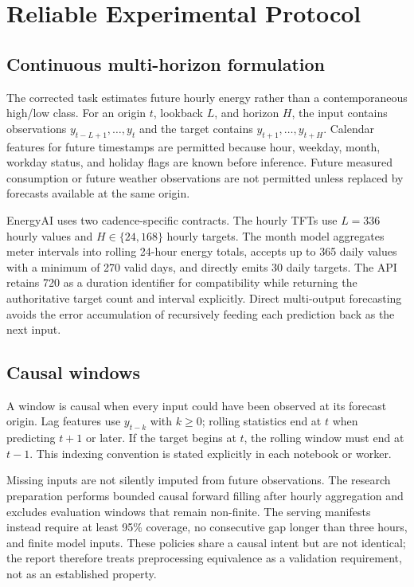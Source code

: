 \chapter{Reliable Experimental Protocol}
\label{chap:protocol}

\section{Continuous multi-horizon formulation}

The corrected task estimates future hourly energy rather than a contemporaneous high/low class. For an origin $t$, lookback $L$, and horizon $H$, the input contains observations $y_{t-L+1},\ldots,y_t$ and the target contains $y_{t+1},\ldots,y_{t+H}$. Calendar features for future timestamps are permitted because hour, weekday, month, workday status, and holiday flags are known before inference. Future measured consumption or future weather observations are not permitted unless replaced by forecasts available at the same origin.

EnergyAI uses two cadence-specific contracts. The hourly TFTs use $L=336$ hourly values and $H\in\{24,168\}$ hourly targets. The month model aggregates meter intervals into rolling 24-hour energy totals, accepts up to 365 daily values with a minimum of 270 valid days, and directly emits 30 daily targets. The API retains 720 as a duration identifier for compatibility while returning the authoritative target count and interval explicitly. Direct multi-output forecasting avoids the error accumulation of recursively feeding each prediction back as the next input.

\section{Causal windows}

A window is causal when every input could have been observed at its forecast origin. Lag features use $y_{t-k}$ with $k\geq 0$; rolling statistics end at $t$ when predicting $t+1$ or later. If the target begins at $t$, the rolling window must end at $t-1$. This indexing convention is stated explicitly in each notebook or worker.

Missing inputs are not silently imputed from future observations. The research preparation performs bounded causal forward filling after hourly aggregation and excludes evaluation windows that remain non-finite. The serving manifests instead require at least 95\% coverage, no consecutive gap longer than three hours, and finite model inputs. These policies share a causal intent but are not identical; the report therefore treats preprocessing equivalence as a validation requirement, not as an established property.

